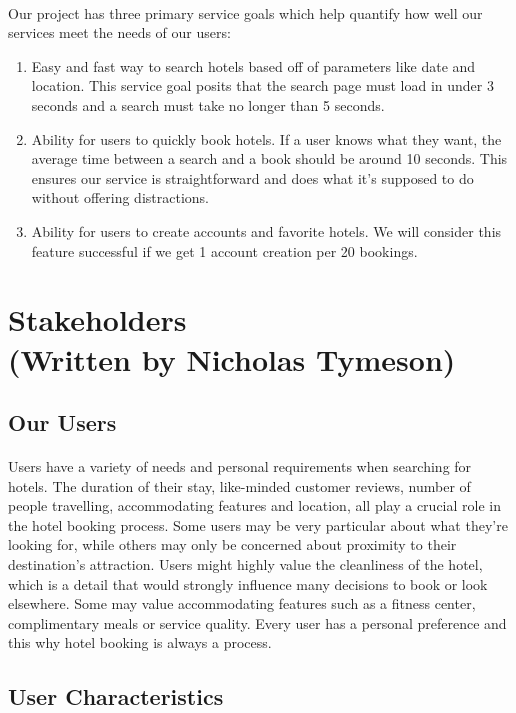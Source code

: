 \documentclass[]{article}
\begin{document}
\paragraph{}
Our project has three primary service goals which help quantify how well our services meet the needs of our users:
\begin{enumerate}
    \item Easy and fast way to search hotels based off of parameters like date and location. This service goal posits that the search page must load in under 3 seconds and a search must take no longer than 5 seconds. 
    \item Ability for users to quickly book hotels. If a user knows what they want, the average time between a search and a book should be around 10 seconds. This ensures our service is straightforward and does what it's supposed to do without offering distractions.
    \item Ability for users to create accounts and favorite hotels. We will consider this feature successful if we get 1 account creation per 20 bookings. 
\end{enumerate}

\section{Stakeholders \\(Written by Nicholas Tymeson)}
\subsection{Our Users}
\paragraph{}
Users have a variety of needs and personal requirements when searching for hotels. The duration of their stay, like-minded customer reviews, number of people travelling, accommodating features and location, all play a crucial role in the hotel booking process. Some users may be very particular about what they’re looking for, while others may only be concerned about proximity to their destination’s attraction. Users might highly value the cleanliness of the hotel, which is a detail that would strongly influence many decisions to book or look elsewhere. Some may value accommodating features such as a fitness center, complimentary meals or service quality. Every user has a personal preference and this why hotel booking is always a process.
\subsection{User Characteristics}
\end{document}
